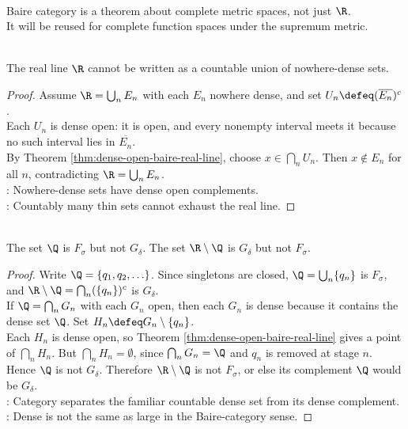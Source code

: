 \begin{perspective} \label{per:baire-category-in-function-spaces} \\
Baire category is a theorem about complete metric spaces, not just $\R$.\\
It will be reused for complete function spaces under the supremum metric.
\end{perspective}

\begin{theorem} \label{thm:baire-category-real-line} \\
The real line $\R$ cannot be written as a countable union of nowhere-dense sets.
\begin{proof}
Assume $\R=\bigcup_nE_n$ with each $E_n$ nowhere dense, and set $U_n\defeq(\overline{E_n})^c$.\\
Each $U_n$ is dense open: it is open, and every nonempty interval meets it because no such interval lies in $\overline{E_n}$.\\
By Theorem \ref{thm:dense-open-baire-real-line}, choose $x\in\bigcap_nU_n$. Then $x\notin E_n$ for all $n$, contradicting $\R=\bigcup_nE_n$.\\
: Nowhere-dense sets have dense open complements.\\
: Countably many thin sets cannot exhaust the real line.
\end{proof}
\end{theorem}

\begin{corollary} \label{cor:rationals-not-gdelta-irrationals-not-fsigma} \\
The set $\Q$ is $F_\sigma$ but not $G_\delta$. The set $\R\setminus\Q$ is $G_\delta$ but not $F_\sigma$.
\begin{proof}
Write $\Q=\{q_1,q_2,\ldots\}$. Since singletons are closed, $\Q=\bigcup_n\{q_n\}$ is $F_\sigma$, and $\R\setminus\Q=\bigcap_n(\{q_n\})^c$ is $G_\delta$.\\
If $\Q=\bigcap_nG_n$ with each $G_n$ open, then each $G_n$ is dense because it contains the dense set $\Q$. Set $H_n\defeq G_n\setminus\{q_n\}$.\\
Each $H_n$ is dense open, so Theorem \ref{thm:dense-open-baire-real-line} gives a point of $\bigcap_nH_n$. But $\bigcap_nH_n=\emptyset$, since $\bigcap_nG_n=\Q$ and $q_n$ is removed at stage $n$. Hence $\Q$ is not $G_\delta$. Therefore $\R\setminus\Q$ is not $F_\sigma$, or else its complement $\Q$ would be $G_\delta$.\\
: Category separates the familiar countable dense set from its dense complement.\\
: Dense is not the same as large in the Baire-category sense.
\end{proof}
\end{corollary}

